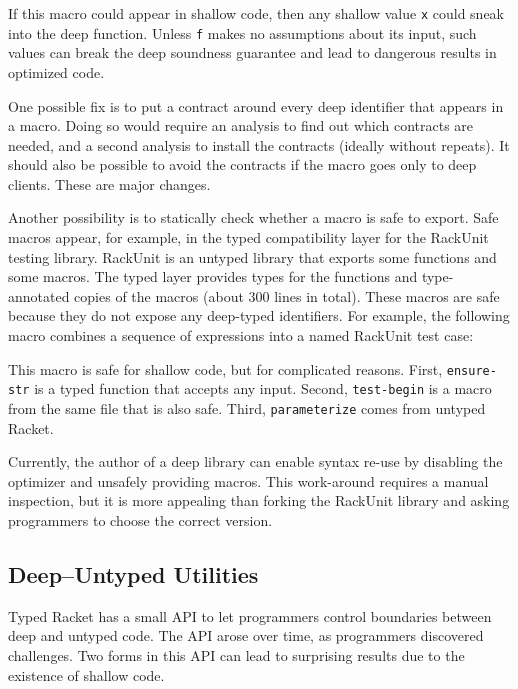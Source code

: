 \documentclass[ twoside,open=right,titlepage,numbers=noenddot,headinclude,%
                footinclude=true,cleardoublepage=empty,abstract=off,
                BCOR=5mm,paper=a4,fontsize=11pt,%
                ngerman,american,%
                parts,pdfspacing]{scrreprt}
\newcommand{\Scribtexttt}[1]{{\texttt{#1}}}
\newcommand{\Ssubsubsection}[2]{\subsubsection[#1]{#2}}
\renewcommand{\Ssubsubsection}[2]{\subsection[#1]{#2}}
\begin{document}

\noindent{}If this macro could appear in shallow code, then any
 shallow value \Scribtexttt{x} could sneak into the deep function.
Unless \Scribtexttt{f} makes no assumptions about its input, such values can break
 the deep soundness guarantee and lead to dangerous results in optimized
 code.

One possible fix is to put a contract around every deep identifier that
 appears in a macro.
Doing so would require an analysis to find out which contracts are needed,
 and a second analysis to install the contracts (ideally without repeats).
It should also be possible to avoid the contracts if the macro goes only to deep clients.
These are major changes.

Another possibility is to statically check whether a macro is safe to
 export.
Safe macros appear, for example, in the typed compatibility layer for the
 RackUnit testing library.
RackUnit is an untyped library that exports some functions and some macros.
The typed layer provides types for the functions and type{-}annotated copies
 of the macros (about 300 lines in total).
These macros are safe because they do not expose any deep{-}typed identifiers.
For example, the following macro combines a sequence of expressions into
 a named RackUnit test case:


\noindent{}This macro is safe for shallow code, but for complicated reasons.
First, \Scribtexttt{ensure{-}str} is a typed function that accepts any input.
Second, \Scribtexttt{test{-}begin} is a macro from the same file that is also safe.
Third, \Scribtexttt{parameterize} comes from untyped Racket.

Currently, the author of a deep library can enable syntax re{-}use by disabling the optimizer
 and unsafely providing macros.
This work{-}around requires a manual inspection, but it is more appealing than
 forking the RackUnit library and asking programmers to choose the correct version.

\Ssubsubsection{Deep{--}Untyped Utilities}{Deep{--}Untyped Utilities}\label{t:x28part_x22secx3abothx3aimplx3atux22x29}

Typed Racket has a small API to let programmers control boundaries
 between deep and untyped code.
The API arose over time, as programmers discovered challenges.
Two forms in this API can lead to surprising results due to the existence of
 shallow code.
\end{document}
